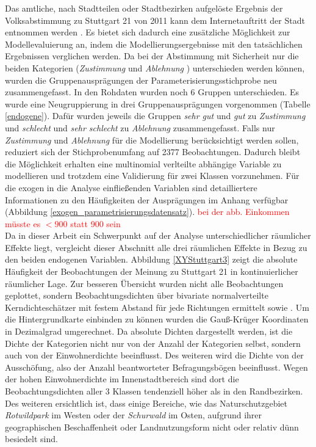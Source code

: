 \documentclass{Vorlage}
\begin{document}
Das amtliche, nach Stadtteilen oder Stadtbezirken aufgelöste Ergebnis der Volksabstimmung zu Stuttgart 21 von 2011 kann 
dem Internetauftritt der Stadt entnommen werden \cite{Amt}. Es bietet sich dadurch eine zusätzliche Möglichkeit zur 
Modellevaluierung an, indem die Modellierungsergebnisse mit den tatsächlichen Ergebnissen verglichen werden. Da bei der 
Abstimmung mit Sicherheit nur die beiden Kategorien (\textit{Zustimmung} und \textit{Ablehnung }) unterschieden werden 
können, wurden die Gruppenausprägungen der Parameterisierungsstichprobe neu zusammengefasst. In den Rohdaten wurden noch 
6 Gruppen unterschieden. Es wurde eine Neugruppierung in drei Gruppenausprägungen vorgenommen (Tabelle \ref{endogene}). Dafür wurden jeweils die 
Gruppen \textit{sehr gut} und \textit{gut} zu \textit{Zustimmung} und \textit{schlecht} und \textit{sehr schlecht} zu 
\textit{Ablehnung} zusammengefasst. Falls nur \textit{Zustimmung} und \textit{Ablehnung} für die Modellierung 
berücksichtigt werden sollen, reduziert sich der Stichprobenumfang auf 2377 Beobachtungen. Dadurch bleibt die 
Möglichkeit erhalten eine multinomial verlteilte abhängige Variable zu modellieren und trotzdem eine Validierung für 
zwei Klassen vorzunehmen. Für die exogen in die Analyse einfließenden Variablen sind detailliertere Informationen zu den 
Häufigkeiten der Ausprägungen im Anhang verfügbar (Abbildung \ref{exogen_parametrisierungsdatensatz}). 
\textcolor{red}{bei der abb. Einkommen müsste es $<900$ statt 900 sein}\\

Da in dieser Arbeit ein Schwerpunkt auf der Analyse unterschiedlicher räumlicher Effekte liegt, vergleicht dieser Abschnitt alle drei räumlichen Effekte in Bezug zu den beiden endogenen Variablen. Abbildung \ref{XYStuttgart3} zeigt die absolute Häufigkeit der Beobachtungen der Meinung zu Stuttgart 21 in kontinuierlicher räumlicher Lage. Zur besseren Übersicht wurden nicht alle Beobachtungen geplottet, sondern Beobachtungsdichten über bivariate normalverteilte Kerndichteschätzer mit festem Abstand für jede Richtungen ermittelt \cite{ggplot} sowie \cite{MASS}. Um die Hintergrundkarte einbinden zu können wurden die Gauß-Krüger Koordinaten in Dezimalgrad umgerechnet. Da absolute Dichten dargestellt werden, ist die Dichte der Kategorien nicht nur von der Anzahl der Kategorien selbst, sondern auch von der Einwohnerdichte beeinflusst. Des weiteren wird die Dichte von der Ausschöfung, also der Anzahl beantworteter Befragungsbögen beeinflusst. Wegen der hohen Einwohnerdichte im Innenstadtbereich sind dort die Beobachtungsdichten aller 3 Klassen tendenziell höher als in den Randbezirken. Des weiteren ersichtlich ist, dass einige Bereiche, wie das Naturschutzgebiet \textit{Rotwildpark} im Westen oder der \textit{Schurwald} im Osten, aufgrund ihrer geographischen Beschaffenheit oder Landnutzungsform nicht oder relativ dünn besiedelt sind.
\end{document}
